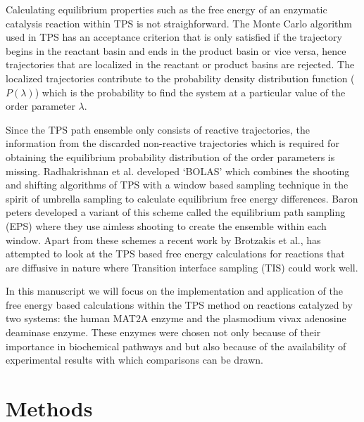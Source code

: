 \documentclass[journal=jpcbfk,manuscript=article,layout=traditional]{achemso}
\begin{document}
Calculating equilibrium properties such as the free energy of an enzymatic 
catalysis reaction within TPS is not straighforward. 
The Monte Carlo algorithm used in TPS has an acceptance criterion that 
is only satisfied if the trajectory begins in the reactant basin and ends in 
the product basin or vice versa, hence trajectories that are localized in the 
reactant or product basins are rejected. The localized trajectories contribute
to the probability density distribution function ($P(\lambda)$) which is the 
probability to find the system at a particular value of the order parameter $\lambda$.

Since the TPS path ensemble only consists of reactive trajectories, the information from 
the discarded non-reactive trajectories which is required for obtaining the 
equilibrium probability distribution of the order parameters is 
missing. \cite{Dellago09AdvCompSimAppp167} Radhakrishnan et al. developed 
`BOLAS' which combines the shooting and shifting algorithms of 
TPS with a window based sampling technique 
in the spirit of umbrella sampling to calculate equilibrium free energy 
differences. \cite{Radhakrishnan04JChemPhys121p2436} 
Baron peters developed a variant of this scheme called the 
equilibrium path sampling (EPS) where they use aimless shooting 
to create the ensemble within each window. \cite{Peters08JAmChemSoc130p17342,Silveira21JPhysChemB125p2018} 
Apart from these schemes a recent work by 
Brotzakis et al., \cite{Brotzakis19JChemPhys151p174111,Dellago04MolSimul30p795}
has attempted to look at the TPS based free energy calculations for 
reactions that are diffusive in nature where 
Transition interface sampling (TIS) \cite{vanErp03JChemPhys118p7762}
could work well. 

In this manuscript we will focus on the implementation and application of the 
free energy based calculations within the TPS method on reactions catalyzed by two systems:
the human MAT2A enzyme and the plasmodium vivax adenosine deaminase 
enzyme. \cite{Luo07JAmChemSoc129p8008,Ho09Biochemistry48p9618}
These enzymes were chosen not only because of their importance in biochemical pathways and
but also because of the availability of experimental results with which comparisons can 
be drawn. 
\section{Methods}
\end{document}
